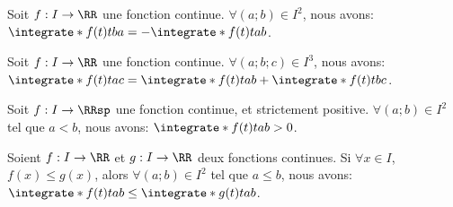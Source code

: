 \begin{fact} \label{int-dir}
	Soit $f: I \to \RR$ une fonction continue.
	$\forall(a;b) \in I^2$,
	nous avons:
	$\integrate*{f(t)}{t}{b}{a} = - \integrate*{f(t)}{t}{a}{b}$.
\end{fact}




\begin{fact} \label{int-rdc}
	Soit $f: I \to \RR$ une fonction continue.
	$\forall(a;b;c) \in I^3$,
	nous avons:
	$\integrate*{f(t)}{t}{a}{c} = \integrate*{f(t)}{t}{a}{b} + \integrate*{f(t)}{t}{b}{c}$.
\end{fact}




\begin{fact} \label{int-pos}
	Soit $f: I \to \RRsp$ une fonction continue, et strictement positive.
	$\forall(a;b) \in I^2$ tel que $a < b$,
	nous avons:
	$\integrate*{f(t)}{t}{a}{b} > 0$.
\end{fact}




\begin{fact} \label{int-mono}
	Soient $f: I \to \RR$ et $g: I \to \RR$ deux fonctions continues.
	Si $\forall x \in I$, $f(x) \leq g(x)$,
	alors
	$\forall(a;b) \in I^2$ tel que $a \leq b$,
	nous avons:
	$\integrate*{f(t)}{t}{a}{b} \leq \integrate*{g(t)}{t}{a}{b}$.
\end{fact}

